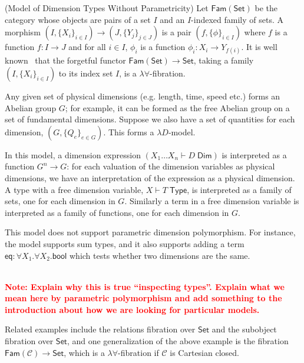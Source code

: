 \documentclass[a4paper,UKenglish]{lipics}
\newcommand\note[1]{{ \bf \textcolor{red} {\vspace{2mm}\; \\ Note: #1\\}}}
\newcommand{\msf}[1]{\mathsf{#1}} %
\newcommand{\Set}{\msf{Set}}
\newcommand{\Fam}[1]{\msf{Fam}(#1)}
\newcommand{\C}{\mathcal{C}}
\newcommand{\bool}{\msf{bool}}
\newcommand{\Tj}[2]{#1 \vdash #2 \; \msf{ Type}}
\newcommand{\Dj}[2]{#1 \vdash #2 \; \msf{ Dim}}
\newcommand{\Dim}{D}
\newcommand{\Dvar}{X}
\begin{document}
\begin{example}(Model of Dimension Types Without Parametricity)
Let $\Fam\Set$ be the category whose objects are pairs of a set $I$ and an $I$-indexed family of sets. A morphism $(I,\{X_i\}_{i\in I})\to (J,\{Y_j\}_{j\in J})$ is a pair $(f,\{\phi\}_{i\in I})$ where $f$ is a function $f:I\to J$ and for all $i\in I$, $\phi_i$ is a function $\phi_i:X_i\to Y_{f(i)}$. It is well known~\cite{} that the forgetful functor $\Fam\Set\to \Set$, taking a family $(I,\{X_i\}_{i\in I})$ to its index set $I$, is a $\lambda\forall$-fibration.

Any given set of physical dimensions (e.g. length, time, speed etc.) forms an Abelian group $G$; for example, it can be formed as the free Abelian group on a set of fundamental dimensions. Suppose we also have a set of quantities for each dimension, $(G,\{Q_e\}_{e\in G})$. This forms a $\lambda D$-model.

In this model, a dimension expression $(\Dj{\Dvar_1\dots \Dvar_n} \Dim)$ is interpreted as a function $G^n\to G$: for each valuation of the dimension variables as physical dimensions, we have an interpretation of the expression as a physical dimension. A type with a free dimension variable, $\Tj \Dvar T$, is interpreted as a family of sets, one for each dimension in $G$. Similarly a term in a free dimension variable is interpreted as a family of functions, one for each dimension in $G$.

This model does not support parametric dimension polymorphism. For instance, the model supports sum types, and it also supports adding a term $\mathsf{eq}:\forall \Dvar_1.\forall \Dvar_2.\bool$ which tests whether two dimensions are the same.

\note{Explain why this is true ``inspecting types''. Explain what we mean here by parametric polymorphism and add something to the introduction about how we are looking for particular models.}

Related examples include the relations fibration over $\Set$ and the subobject fibration over $\Set$, and one generalization of the above example is the fibration $\Fam{\C}\to\Set$, which is a $\lambda\forall$-fibration if $\C$ is Cartesian closed.
\end{example}
\end{document}
